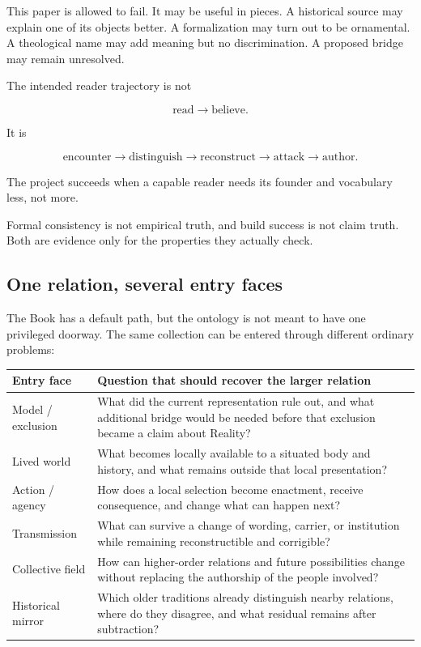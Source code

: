\documentclass[11pt]{article}
\begin{document}
This paper is allowed to fail. It may be useful in pieces. A historical source may explain one of its objects better. A formalization may turn out to be ornamental. A theological name may add meaning but no discrimination. A proposed bridge may remain unresolved.

The intended reader trajectory is not

\begin{equation}
\text{read}\rightarrow\text{believe}.
\end{equation}

It is

\begin{equation}
\text{encounter}\rightarrow\text{distinguish}\rightarrow\text{reconstruct}
\rightarrow\text{attack}\rightarrow\text{author}.
\end{equation}

The project succeeds when a capable reader needs its founder and vocabulary less, not more.

Formal consistency is not empirical truth, and build success is not claim truth. Both are evidence only for the properties they actually check.

\subsection{One relation, several entry faces}

The Book has a default path, but the ontology is not meant to have one privileged doorway. The same collection can be entered through different ordinary problems:

\begin{center}
\begin{tabularx}{0.96\textwidth}{lX}
\toprule
Entry face & Question that should recover the larger relation \\
\midrule
Model / exclusion & What did the current representation rule out, and what additional bridge would be needed before that exclusion became a claim about Reality? \\
Lived world & What becomes locally available to a situated body and history, and what remains outside that local presentation? \\
Action / agency & How does a local selection become enactment, receive consequence, and change what can happen next? \\
Transmission & What can survive a change of wording, carrier, or institution while remaining reconstructible and corrigible? \\
Collective field & How can higher-order relations and future possibilities change without replacing the authorship of the people involved? \\
Historical mirror & Which older traditions already distinguish nearby relations, where do they disagree, and what residual remains after subtraction? \\
\bottomrule
\end{tabularx}
\end{center}
\end{document}
